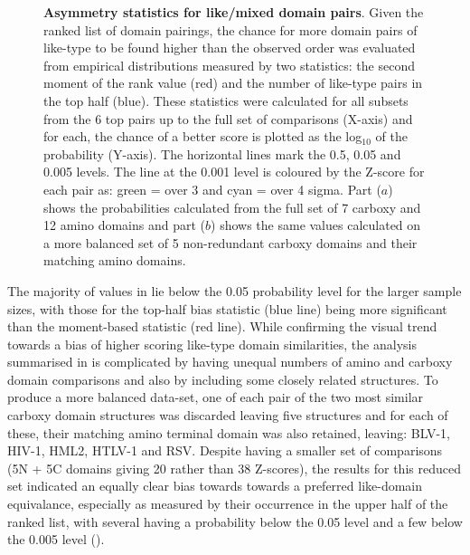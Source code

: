 \begin{figure}
\centering
{}
\begin{footnotesize}
\caption{
\label{Fig:splits}
{\bf Asymmetry statistics for like/mixed domain pairs}.
Given the ranked list of domain pairings, the chance for more domain pairs of like-type
to be found higher than the observed order was evaluated from empirical distributions
measured by two statistics: the second moment of the rank value (red) and the number
of like-type pairs in the top half (blue).   These statistics were calculated for all
subsets from the 6 top pairs up to the full set of comparisons (X-axis) and for each,
the chance of a better score is plotted as the log$_{10}$ of the probability (Y-axis).  
The horizontal lines mark the 0.5, 0.05 and 0.005 levels.
The line at the 0.001 level is coloured by the Z-score for each pair as: green = over 3
and cyan = over 4 sigma.
Part ($a$) shows the probabilities calculated from the full set of 7 carboxy and 12
amino domains and part ($b$) shows the same values calculated on a more balanced
set of 5 non-redundant carboxy domains and their matching amino domains.
}
\end{footnotesize}
\end{figure}

The majority of values in  lie below the 0.05 probability level for the larger sample sizes,
with those for the top-half bias statistic (blue line) being more significant than the moment-based statistic (red line).  
While confirming the visual trend towards a bias of higher scoring like-type domain similarities, the analysis
summarised in  is complicated by having unequal numbers of amino and carboxy domain comparisons
and also by including some closely related structures.   To produce a more balanced data-set, one of each
pair of the two most similar carboxy domain structures was discarded leaving five structures and for each
of these, their matching amino terminal domain was also retained, leaving: BLV-1, HIV-1, HML2, HTLV-1 and RSV.  
Despite having a smaller set of comparisons
(5N + 5C domains giving 20 rather than 38 Z-scores), the results for this reduced set indicated
an equally clear bias towards towards a preferred like-domain equivalance, especially as measured by their
occurrence in the upper half of the ranked list, with several having a probability below the 0.05 level and
a few below the 0.005 level ().  

